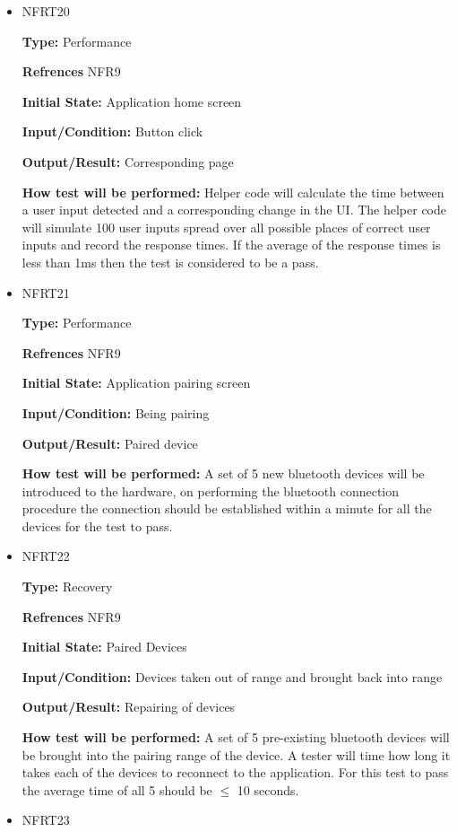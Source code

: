 \documentclass[12pt, titlepage]{article}
\begin{document}
\begin{itemize}
\item{NFRT20}

\textbf{Type:} Performance

\textbf{Refrences} NFR9
					
\textbf{Initial State:} Application home screen 
					
\textbf{Input/Condition:} Button click 
					
\textbf{Output/Result:} Corresponding page
					
\textbf{How test will be performed:} Helper code will calculate the time between a user input detected and a corresponding change in the UI. The helper code will simulate 100 user inputs spread over all possible places of correct user inputs and record the response times. If the average of the response times is less than 1ms then the test is considered to be a pass.

\item{NFRT21}

\textbf{Type:} Performance

\textbf{Refrences} NFR9
					
\textbf{Initial State:} Application pairing screen
					
\textbf{Input/Condition:} Being pairing
					
\textbf{Output/Result:} Paired device 
					
\textbf{How test will be performed:} A set of 5 new bluetooth devices will be introduced to the hardware, on performing the bluetooth connection procedure the connection should be established within a minute for all the devices for the test to pass.

\item{NFRT22}

\textbf{Type:} Recovery

\textbf{Refrences} NFR9
					
\textbf{Initial State:} Paired Devices
					
\textbf{Input/Condition:} Devices taken out of range and brought back into range
					
\textbf{Output/Result:} Repairing of devices
					
\textbf{How test will be performed:} A set of 5 pre-existing bluetooth devices will be brought into the pairing range of the device. A tester will time how long it takes each of the devices to reconnect to the application. For this test to pass the average time of all 5 should be $\leq$ 10 seconds.

\item{NFRT23}


\end{itemize}
\end{document}
